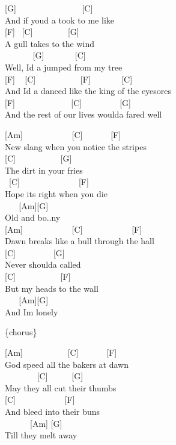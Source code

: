 \documentclass[
  letterpaper,
]{scrbook}
\begin{document}
{[}G{]} ~ ~ ~ ~ ~ ~ ~ ~ ~ {[}C{]}\\
And if you\textquotesingle d a took to me like\\
{[}F{]} ~{[}C{]} ~ ~ ~ ~ ~{[}G{]}\\
A gull takes to the wind\\
\hspace*{0.333em} ~ ~ ~ ~ {[}G{]} ~ ~ ~ ~ {[}C{]}\\
Well, I\textquotesingle d a jumped from my tree\\
\hspace*{0.333em} {[}F{]} ~ {[}C{]} ~ ~ ~ ~ ~ ~ {[}F{]} ~ ~ ~ ~
{[}C{]}\\
And I\textquotesingle d a danced like the king of the eyesores\\
{[}F{]} ~ ~ ~ ~ ~ ~ ~ ~{[}C{]} ~ ~ ~ ~ ~ {[}G{]}\\
And the rest of our lives would\textquotesingle a fared well

{[}Am{]} ~ ~ ~ ~ ~ ~ ~{[}C{]} ~ ~ ~ ~{[}F{]}\\
New slang when you notice the stripes\\
{[}C{]} ~ ~ ~ ~ ~ ~ {[}G{]}\\
The dirt in your fries\\
\hspace*{0.333em} ~{[}C{]} ~ ~ ~ ~ ~ ~ ~ ~ {[}F{]}\\
Hope it\textquotesingle s right when you die\\
\hspace*{0.333em} ~ ~ {[}Am{]}{[}G{]}\\
Old and bo..ny\\
{[}Am{]} ~ ~ ~ ~ ~ ~ ~{[}C{]} ~ ~ ~ ~ ~ ~ ~{[}F{]}\\
Dawn breaks like a bull through the hall\\
{[}C{]} ~ ~ ~ ~ ~ {[}G{]}\\
Never should\textquotesingle a called\\
\hspace*{0.333em} {[}C{]} ~ ~ ~ ~ ~ ~ {[}F{]}\\
But my heads to the wall\\
\hspace*{0.333em} ~ ~ {[}Am{]}{[}G{]}\\
And I\textquotesingle m lonely

\{chorus\}

{[}Am{]} ~ ~ ~ ~ ~ ~ {[}C{]} ~ ~ ~ ~{[}F{]}\\
God speed all the baker\textquotesingle s at dawn\\
\hspace*{0.333em} ~ ~ ~ ~ ~{[}C{]} ~ ~ ~ {[}G{]}\\
May they all cut their thumbs\\
\hspace*{0.333em} {[}C{]} ~ ~ ~ ~ ~ ~ ~{[}F{]}\\
And bleed into their buns\\
\hspace*{0.333em} ~ ~ ~ ~{[}Am{]} {[}G{]}\\
\textquotesingle Till they melt away
\end{document}

